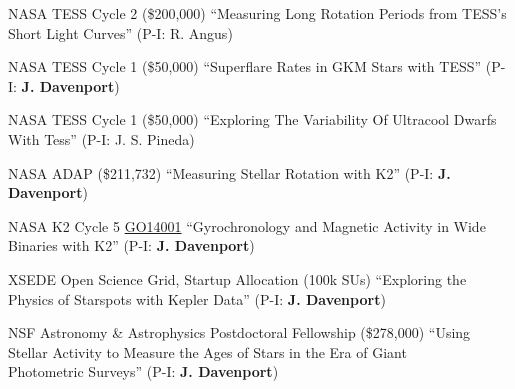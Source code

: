 \documentclass{article}
\begin{document}
\begin{llist}
NASA TESS Cycle 2 (\$200,000) 
``Measuring Long Rotation Periods from TESS's Short Light Curves'' (P-I: R. Angus)

NASA TESS Cycle 1 (\$50,000) 
``Superflare Rates in GKM Stars with TESS'' (P-I: {\bf J. Davenport})

NASA TESS Cycle 1 (\$50,000) 
``Exploring The Variability Of Ultracool Dwarfs With Tess'' (P-I: J. S. Pineda)

NASA ADAP (\$211,732) 
``Measuring Stellar Rotation with K2'' (P-I: {\bf J. Davenport})

NASA K2 Cycle 5 \href{https://keplergo.arc.nasa.gov/data/k2-programs/GO14001.txt}{\color{blue}GO14001} 
``Gyrochronology and Magnetic Activity in Wide Binaries with K2'' (P-I: {\bf J. Davenport})



XSEDE Open Science Grid, Startup Allocation (100k SUs) 
``Exploring the Physics of Starspots with Kepler Data'' (P-I: {\bf J. Davenport})

NSF Astronomy \& Astrophysics Postdoctoral Fellowship (\$278,000) 
``Using Stellar Activity to Measure the Ages of Stars in the Era of Giant\\ Photometric Surveys'' (P-I: {\bf J. Davenport})













\end{llist}
\end{document}
